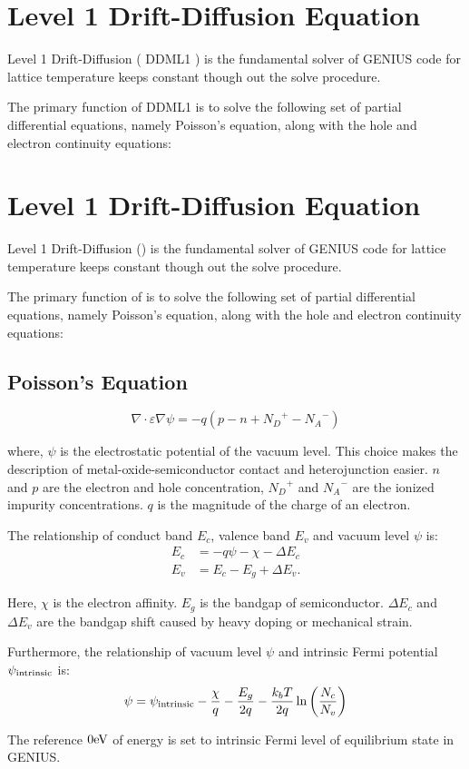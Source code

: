 \documentclass[oneside,12pt]{cgd_book}
\begin{document}
\section{Level 1 Drift-Diffusion Equation}
Level 1 Drift-Diffusion ( DDML1 ) is the fundamental solver of GENIUS code for
lattice temperature keeps constant though out the solve procedure.

The primary function of DDML1 is to solve the following set of partial differential
equations, namely Poisson's equation, along with the hole and electron continuity
equations:

\section{Level 1 Drift-Diffusion Equation}
Level 1 Drift-Diffusion ()  is the fundamental solver of GENIUS code for lattice temperature keeps constant though out the solve
      procedure.
\par
The primary function of  is to solve the following set of partial differential
      equations, namely Poisson's equation, along with the hole and electron continuity equations:
\subsection{Poisson's Equation}
\begin{equation}
\nabla \cdot \varepsilon \nabla \psi = - q\left( p - n + {N_D}^+ - {N_A}^- \right)
\end{equation}\par\par
\label{Poisson's Equation}where, $\psi$ is the electrostatic potential of the vacuum level. This
      choice makes the description of metal-oxide-semiconductor contact and heterojunction easier.
$n$ and $p$ are the electron and hole concentration, ${N_D}^{+}$
and ${N_A}^{-}$ are the ionized impurity
      concentrations. $q$ is the magnitude of the charge of an electron.
\par
The relationship of conduct band $E_c$, valence band $E_v$ and vacuum level
$\psi$ is:
\begin{subequations}
\begin{align}
 E_c  &=-q\psi-\chi-\Delta E_c\\
 E_v  &=E_c-E_g+\Delta E_v.
\end{align}
\end{subequations}
\par
Here, $\chi$ is the electron affinity. $E_g$ is the
      bandgap of semiconductor. $\Delta E_c$ and $\Delta E_v$ are the bandgap shift caused by heavy doping or mechanical strain.
\par
Furthermore, the relationship of vacuum level $\psi$ and intrinsic Fermi
      potential $\psi_ {\rm intrinsic}$ is:
\begin{equation}
\psi = \psi _{\rm intrinsic} - \frac{\chi}{q} - \frac{E_g}{2q} - \frac{k_b T}{2q}\ln \left(
          \frac{N_c}{N_v} \right)
\end{equation}
\par
The reference $0\text{eV}$ of energy is set to intrinsic Fermi level of equilibrium
      state in GENIUS.
\par
\end{document}
